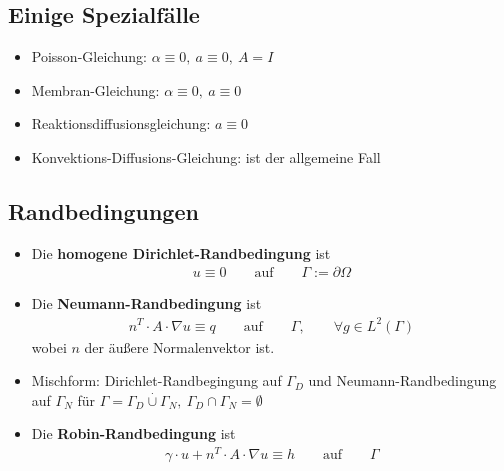 \subsection*{Einige Spezialfälle}
\begin{itemize}
	\item Poisson-Gleichung: $\alpha\equiv 0,~a\equiv0,~A=I$
	\item Membran-Gleichung: $\alpha\equiv0,~a\equiv 0$
	\item Reaktionsdiffusionsgleichung: $a\equiv 0$
	\item Konvektions-Diffusions-Gleichung: ist der allgemeine Fall
\end{itemize}

\subsection*{Randbedingungen}
\begin{itemize}
	\item Die \textbf{homogene Dirichlet-Randbedingung} ist
	\begin{align*}
		u\equiv0\qquad\text{auf}\qquad\Gamma:=\partial\Omega
	\end{align*}
	\item Die \textbf{Neumann-Randbedingung} ist
	\begin{align*}
		n^T\cdot A\cdot\nabla u\equiv q\qquad\text{auf}\qquad\Gamma,\qquad\forall g\in L^2(\Gamma)
	\end{align*}
	wobei $n$ der äußere Normalenvektor ist.
	\item Mischform: Dirichlet-Randbegingung auf $\Gamma_D$ und Neumann-Randbedingung auf $\Gamma_N$ für 
	$\Gamma=\Gamma_D\stackrel{\cdot}{\cup}\Gamma_N,~\Gamma_D\cap\Gamma_N=\emptyset$
	\item Die \textbf{Robin-Randbedingung} ist
	\begin{align*}
		\gamma\cdot u+n^T\cdot A\cdot\nabla u\equiv h\qquad\text{auf}\qquad\Gamma
	\end{align*}
\end{itemize}

